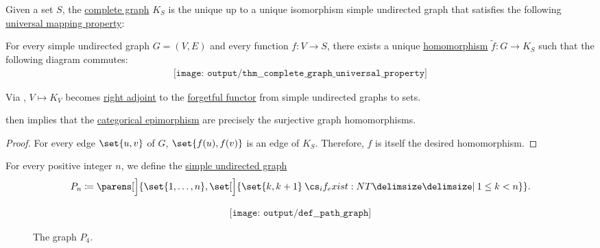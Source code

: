 \begin{theorem}\label{thm:complete_graph_universal_property}
  Given a set \( S \), the \hyperref[def:complete_graph]{complete graph} \( K_S \) is the unique up to a unique isomorphism simple undirected graph that satisfies the following \hyperref[rem:universal_mapping_property]{universal mapping property}:
  \begin{displayquote}
    For every simple undirected graph \( G = (V, E) \) and every function \( f: V \to S \), there exists a unique \hyperref[def:undirected_graph/homomorphism]{homomorphism} \( \widetilde{f}: G \to K_S \) such that the following diagram commutes:
    \begin{equation}\label{eq:thm:edgeless_graph_universal_property/diagram}
      \begin{aligned}
        \texttt{[image: output/thm\_\_complete\_graph\_universal\_property]}
      \end{aligned}
    \end{equation}
  \end{displayquote}
\end{theorem}
\begin{comments}
  \item Via , \( V \mapsto K_V \) becomes \hyperref[def:category_adjunction]{right adjoint} to the \hyperref[def:concrete_category]{forgetful functor} from simple undirected graphs to sets.

   then implies that the \hyperref[def:morphism_invertibility/right_cancellative]{categorical epimorphism} are precisely the surjective graph homomorphisms.
\end{comments}
\begin{proof}
  For every edge \( \set{ u, v } \) of \( G \), \( \set{ f(u), f(v) } \) is an edge of \( K_S \). Therefore, \( f \) is itself the desired homomorphism.
\end{proof}

\begin{definition}\label{def:path_graph}
  For every positive integer \( n \), we define the \hyperref[def:undirected_graph]{simple undirected graph}
  \begin{equation*}
    P_n \coloneqq \parens[\Big]{ \set{ 1, \ldots, n }, \set[\Big]{ \set{ k, k + 1 } \given* 1 \leq k < n } }.
  \end{equation*}

  \begin{figure}[!ht]
    \begin{equation}\label{eq:fig:def:path_graph/p4}
      \begin{aligned}
        \texttt{[image: output/def\_\_path\_graph]}
      \end{aligned}
    \end{equation}
    \caption{The graph \hyperref[def:path_graph]{\( P_4 \)}.}\label{fig:def:path_graph/p4}
  \end{figure}
\end{definition}

